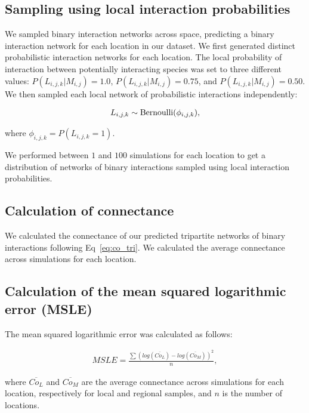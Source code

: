 \begin{refsection}
\subsection{Sampling using local interaction probabilities}

We sampled binary interaction networks across space, predicting a binary
interaction network for each location in our dataset. We first generated
distinct probabilistic interaction networks for each location. The local
probability of interaction between potentially interacting species was set to
three different values: $P(L_{i, j, k}|M_{i, j}) = 1.0$, $P(L_{i, j, k}|M_{i,
j}) = 0.75$, and $P(L_{i, j, k}|M_{i, j}) = 0.50$. We then sampled each local
network of probabilistic interactions independently: 

\begin{eqnarray}
    \label{eq:sampling2}
    L_{i, j, k} \sim {\rm Bernoulli}(\phi_{i,j,k}),
  \end{eqnarray}
  
where $\phi_{i,j,k} = P(L_{i, j, k} = 1)$.

We performed between $1$ and $100$ simulations for each location to get a
distribution of networks of binary interactions sampled using local interaction
probabilities. 

\subsection{Calculation of connectance}

We calculated the connectance of our predicted tripartite networks of binary
interactions following Eq~\ref{eq:co_tri}. We calculated the average connectance
across simulations for each location.

\subsection{Calculation of the mean squared logarithmic error (MSLE)}

The mean squared logarithmic error was calculated as follows: 

\begin{eqnarray}
    \label{eq:MSLE_sup}
    MSLE = \frac{\sum (log(\overline{Co_L}) - log(\overline{Co_M}))^2}{n},
\end{eqnarray}

where $\overline{Co_L}$ and $\overline{Co_M}$ are the average connectance across
simulations for each location, respectively for local and regional samples, and
$n$ is the number of locations.

\clearpage


\begingroup
\let\cleardoublepage\clearpage
\printbibliography
\endgroup
\end{refsection}


\endinput
